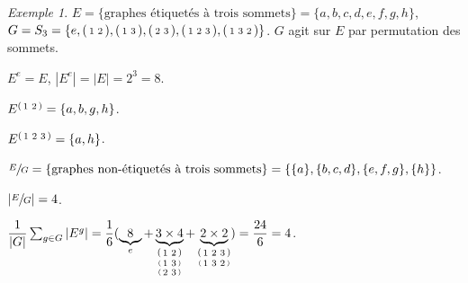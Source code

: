 \documentclass{report}
\newcommand*{\card}[1]{\left| #1 \right|}
\theoremstyle{definition}
\theoremstyle{remark}
\newtheorem*{exem}{Exemple}
\begin{document}
	
	\begin{exem}
		$E = \{\text{graphes \'etiquet\'es \`a trois sommets}\} = \{a,b,c,d,e,f,g,h\}$, $G = S_3 = \{e, \begin{psmallmatrix}
			1&2
		\end{psmallmatrix}, \begin{psmallmatrix}
			1&3
		\end{psmallmatrix}, \begin{psmallmatrix}
			2&3
		\end{psmallmatrix}, \begin{psmallmatrix}
			1&2&3
		\end{psmallmatrix}, \begin{psmallmatrix}
			1&3&2
		\end{psmallmatrix}\}$. $G$ agit sur $E$ par permutation des sommets.

		$E^e = E$, $\card{E^e} = \card{E} = 2^3 = 8$.

		$E^{\begin{psmallmatrix}
				1&2
		\end{psmallmatrix}} = \{a, b, g, h\}$.

		$E^{\begin{psmallmatrix}
				1&2&3
		\end{psmallmatrix}} = \{a, h\}$.

		$\sfrac{E}{G} = \{\text{graphes non-\'etiquet\'es \`a trois sommets}\} = \{\{a\}, \{b,c,d\}, \{e,f,g\}, \{h\}\}$.

		$\card{\sfrac{E}{G}} = 4$.

		$\dfrac{1}{\card{G}} \sum_{g \in G} \card{E^g} = \dfrac{1}{6} ( \underbrace{8}_{e} + \underbrace{3 \times 4}_{\underset{\underset{\begin{psmallmatrix}
						2&3
				\end{psmallmatrix}}{\begin{psmallmatrix}
						1&3
			\end{psmallmatrix}}}{\begin{psmallmatrix}
					1&2
		\end{psmallmatrix}}} + \underbrace{2 \times 2}_{\underset{\begin{psmallmatrix}
		1&3&2
	\end{psmallmatrix}}{\begin{psmallmatrix}
	1&2&3
\end{psmallmatrix}}} ) = \dfrac{24}{6} = 4$.
		\begin{figure}[h]
			\centering
\end{figure}
\end{exem}
\end{document}
